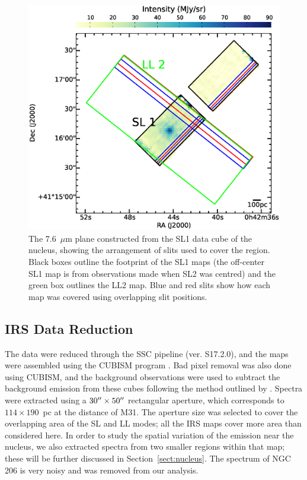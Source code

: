 \begin{figure}
\centering
\includegraphics[scale=0.3]{./fig3.eps}
\caption{The 7.6~$\mu$m plane constructed from the SL1 data cube of the nucleus, showing the arrangement of slits used to cover the region. 
Black boxes outline the footprint of the SL1 maps (the off-center SL1 map is from observations made
when SL2 was centred) and the green box outlines the LL2 map. 
Blue and red slits show how  each map was covered using overlapping slit positions.
\label{slits}
}
\end{figure}

\subsection{IRS Data Reduction}
\label{sect:irs_data}

The data were reduced through the SSC pipeline (ver. S17.2.0), and the maps were assembled using the CUBISM program \citep{Smith:2007fk}. 
Bad pixel removal was also done using CUBISM, and the background observations were used to subtract the background emission from these cubes 
following the method outlined by \citet{Gordon:2008lr}. Spectra were extracted using a $30\hbox{$^{\prime\prime}$}\times50\hbox{$^{\prime\prime}$}$   rectangular aperture,
which corresponds to $114\times190$~pc at the distance of M31.
The aperture size was selected to cover the overlapping area of the SL and LL modes; all the IRS maps cover more area than  considered here.
In order to study the spatial variation of the emission near the nucleus, we also extracted spectra from two smaller regions
within that map; these will be further discussed in Section~\ref{sect:nucleus}.
The spectrum of NGC 206 is very noisy and was removed from our analysis. 

